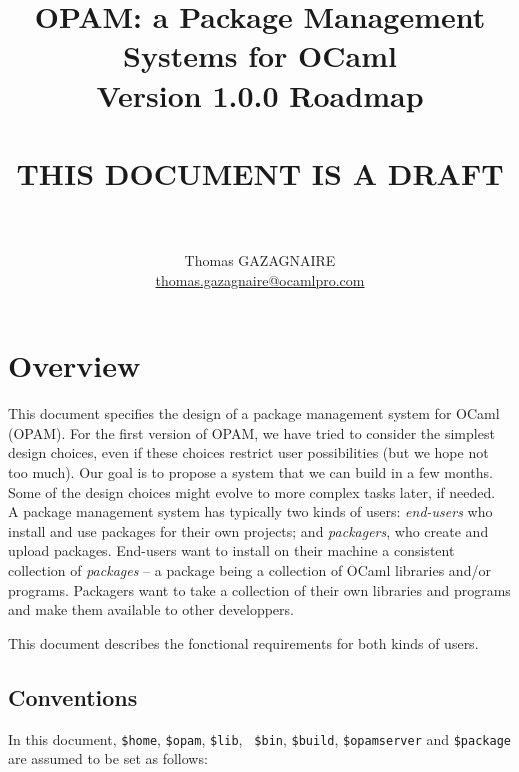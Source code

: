 \documentclass[a4paper,11pt]{article}
\title{
OPAM: a Package Management Systems for OCaml\\
Version 1.0.0 Roadmap\\ ~\ \\
THIS DOCUMENT IS A DRAFT\\
~\ \\}
\author{Thomas GAZAGNAIRE\\
\url{thomas.gazagnaire@ocamlpro.com}\\
}
\begin{document}
\maketitle

\vfill

\tableofcontents

\section*{Overview}

This document specifies the design of a package management system for
OCaml (OPAM). For the first version of OPAM, we have tried to consider
the simplest design choices, even if these choices restrict user
possibilities (but we hope not too much). Our goal is to propose a
system that we can build in a few months. Some of the design choices
might evolve to more complex tasks later, if needed. \\

A package management system has typically two kinds of users: {\em
  end-users} who install and use packages for their own projects; and
{\em packagers}, who create and upload packages. End-users want to
install on their machine a consistent collection of {\em packages} --
a package being a collection of OCaml libraries and/or programs.
Packagers want to take a collection of their own libraries and
programs and make them available to other developpers.

This document describes the fonctional requirements for both kinds of
users.

\subsection*{Conventions}

In this document, {\tt \$home}, {\tt \$opam}, {\tt \$lib}, {\tt
  \$bin}, {\tt \$build}, {\tt \$opamserver} and {\tt \$package} are
assumed to be set as follows:
\end{document}
